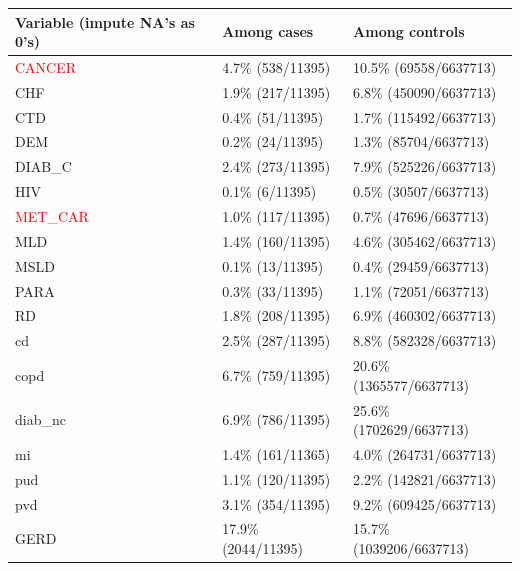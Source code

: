 \documentclass[12pt]{article}
\newcommand{\note}[1]{\textcolor{red}{#1}}
\begin{document}
\begin{center}
\begin{tabular}{|l|l|l|}
  \hline
Variable {\bf (impute NA's as 0's)} & Among cases & Among controls \\ \hline
\note{CANCER}                  & 4.7\% (538/11395)           &  10.5\% (69558/6637713)              \\ \hline
CHF                     & 1.9\% (217/11395)            & 6.8\% (450090/6637713)                \\ \hline
CTD                     & 0.4\% (51/11395)             & 1.7\% (115492/6637713)               \\ \hline
DEM                     & 0.2\% (24/11395)             & 1.3\% (85704/6637713)                \\ \hline
DIAB\_C                 & 2.4\% (273/11395)             & 7.9\% (525226/6637713)               \\ \hline
HIV                     & 0.1\% (6/11395)            & 0.5\% (30507/6637713)                \\ \hline
\note{MET\_CAR}                & 1.0\% (117/11395)             & 0.7\% (47696/6637713)              \\ \hline
MLD                     & 1.4\% (160/11395)            & 4.6\% (305462/6637713)                \\ \hline
MSLD                    & 0.1\% (13/11395)            & 0.4\% (29459/6637713)              \\ \hline
PARA                    & 0.3\% (33/11395)            & 1.1\% (72051/6637713)               \\ \hline
RD                      & 1.8\% (208/11395)            & 6.9\% (460302/6637713)                \\ \hline
cd                      & 2.5\% (287/11395)            & 8.8\% (582328/6637713)               \\ \hline
copd                    & 6.7\% (759/11395)            & 20.6\% (1365577/6637713)               \\ \hline
diab\_nc                & 6.9\% (786/11395)             & 25.6\% (1702629/6637713)               \\ \hline
mi                      & 1.4\% (161/11365)            & 4.0\% (264731/6637713)               \\ \hline
pud                     & 1.1\% (120/11395)            & 2.2\% (142821/6637713)               \\ \hline
pvd                     & 3.1\% (354/11395)            & 9.2\% (609425/6637713)               \\ \hline
GERD                    & 17.9\% (2044/11395)            &  15.7\% (1039206/6637713) \\ \hline
\end{tabular}
\end{center}
\end{document}
